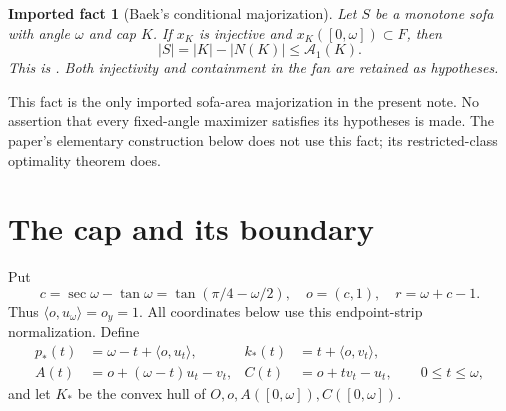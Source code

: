 \documentclass[11pt]{article}
\newtheorem{fact}[theorem]{Imported fact}
\theoremstyle{remark}\newtheorem{remark}[theorem]{Remark}
\newcommand{\area}[1]{\lvert #1\rvert}
\newcommand{\ip}[2]{\langle #1,#2\rangle}
\newcommand{\Aone}{\mathcal A_1}
\begin{document}
\begin{fact}[Baek's conditional majorization]\label{fact:majorization}
Let $S$ be a monotone sofa with angle $\omega$ and cap $K$. If $x_K$ is injective and $x_K([0,\omega])\subset F$, then
\[
 \area S=\area K-\area{N(K)}\le\Aone(K).
\]
This is \cite[Theorem 5.5]{BaekConditional}. Both injectivity and containment in the fan are retained as hypotheses.
\end{fact}

This fact is the only imported sofa-area majorization in the present note. No assertion that every fixed-angle maximizer satisfies its hypotheses is made. The paper's elementary construction below does not use this fact; its restricted-class optimality theorem does.

\section{The cap and its boundary}
Put
\[
 c=\sec\omega-\tan\omega=\tan(\pi/4-\omega/2),\quad o=(c,1),\quad r=\omega+c-1.
\]
Thus $\ip o{u_\omega}=o_y=1$. All coordinates below use this endpoint-strip normalization. Define
\begin{align*}
 p_*(t)&=\omega-t+\ip o{u_t},& k_*(t)&=t+\ip o{v_t},\\
 A(t)&=o+(\omega-t)u_t-v_t,& C(t)&=o+t v_t-u_t,\qquad0\le t\le\omega,
\end{align*}
and let $K_*$ be the convex hull of $O,o,A([0,\omega]),C([0,\omega])$.
\end{document}
